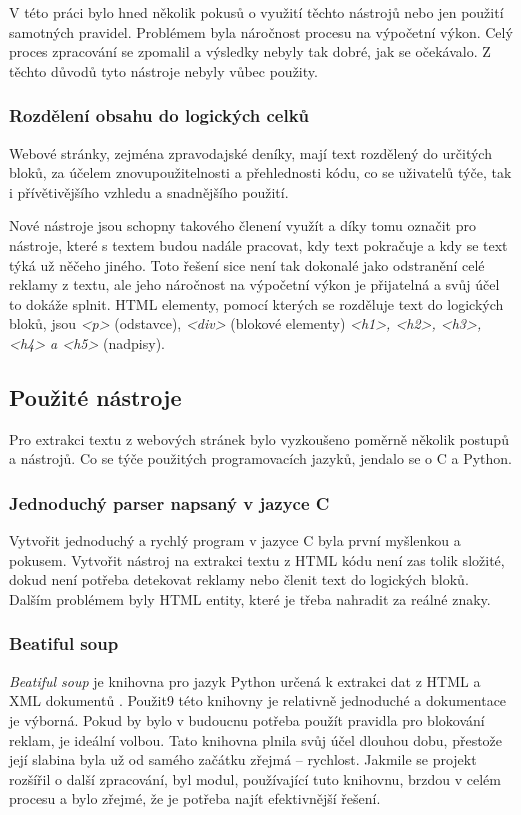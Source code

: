V této práci bylo hned několik pokusů o využití těchto nástrojů nebo jen použití samotných pravidel. Problémem byla náročnost procesu
na výpočetní výkon. Celý proces zpracování se zpomalil a výsledky nebyly tak dobré, jak se očekávalo. Z těchto důvodů tyto nástroje
nebyly vůbec použity.

\subsubsection{Rozdělení obsahu do logických celků}
Webové stránky, zejména zpravodajské deníky, mají text rozdělený do určitých bloků, za účelem
znovupoužitelnosti a přehlednosti kódu, co se uživatelů týče, tak i přívětivějšího vzhledu a
snadnějšího použití.

Nové nástroje jsou schopny takového členení využít a díky tomu označit pro nástroje,
které s textem budou nadále pracovat, kdy text pokračuje a kdy se text týká už něčeho jiného.
Toto řešení sice není tak dokonalé jako odstranění celé reklamy z textu, ale jeho náročnost na výpočetní
výkon je přijatelná a svůj účel to dokáže splnit. HTML elementy, pomocí
kterých se rozděluje text do logických bloků, jsou \textit{<p>} (odstavce),
\textit{<div>} (blokové elementy) \textit{<h1>, <h2>, <h3>, <h4> a <h5>} (nadpisy).

\subsection{Použité nástroje}
Pro extrakci textu z webových stránek bylo vyzkoušeno poměrně několik postupů a nástrojů. Co se týče použitých
programovacích jazyků, jendalo se o C a Python.

\subsubsection{Jednoduchý parser napsaný v jazyce C}
Vytvořit jednoduchý a rychlý program v jazyce C byla první myšlenkou a pokusem. Vytvořit
nástroj na extrakci textu z HTML kódu není zas tolik složité, dokud není potřeba detekovat reklamy nebo
členit text do logických bloků. Dalším problémem byly HTML entity, které je třeba nahradit za reálné znaky.

\subsubsection{Beatiful soup}
\textit{Beatiful soup} je knihovna pro jazyk Python určená k extrakci dat z HTML a XML dokumentů \cite{BEATIFULSOUP}.
Použit9 této knihovny je relativně jednoduché a dokumentace je výborná. Pokud by bylo v budoucnu potřeba použít pravidla pro
blokování reklam, je ideální volbou. Tato knihovna plnila svůj účel dlouhou dobu, přestože její slabina byla už od samého začátku
zřejmá -- rychlost. Jakmile se projekt rozšířil o další zpracování, byl modul, používající tuto knihovnu, brzdou v celém procesu
a bylo zřejmé, že je potřeba najít efektivnější řešení.

